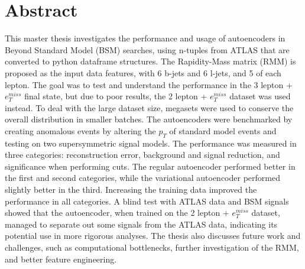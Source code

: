 \chapter*{Abstract} 
This master thesis investigates the performance and usage of autoencoders in Beyond Standard Model (BSM) searches, 
using n-tuples from ATLAS that are converted to python dataframe structures. The Rapidity-Mass matrix (RMM) is proposed 
as the input data features, with 6 b-jets and 6 l-jets, and 5 of each lepton. The goal was to test and understand 
the performance in the 3 lepton + $e_T^{miss}$ final state, but due to poor results, the 2 lepton + $e_T^{miss}$ 
dataset was used instead. To deal with the large dataset size, megasets were used to conserve the overall distribution 
in smaller batches. The autoencoders were benchmarked by creating anomalous events by altering the $p_T$ of standard 
model events and testing on two supersymmetric signal models. The performance was measured in three categories: 
reconstruction error, background and signal reduction, and significance when performing cuts. The regular 
autoencoder performed better in the first and second categories, while the variational autoencoder performed slightly 
better in the third. Increasing the training data improved the performance in all categories. A blind test 
with ATLAS data and BSM signals showed that the autoencoder, when trained on the 2 lepton + $e_T^{miss}$ dataset, 
managed to separate out some signals from the ATLAS data, indicating its potential use in more rigorous analyses. 
The thesis also discusses future work and challenges, such as computational bottlenecks, further investigation of 
the RMM, and better feature engineering.
